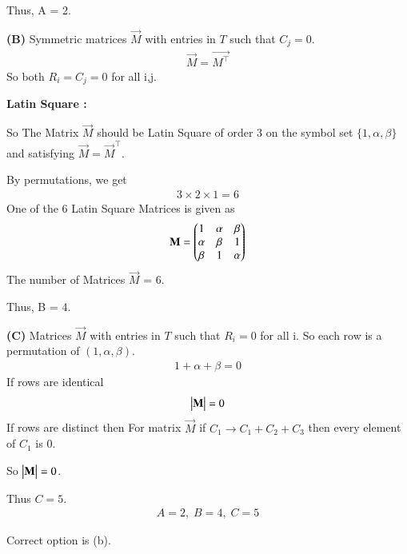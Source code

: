 \documentclass[journal]{IEEEtran}
\begin{document}
Thus, A = 2.

\textbf{(B)} Symmetric matrices $\vec{M}$ with entries in $T$ such that $C_j=0$.  
\begin{align}
\vec{M} = \vec{M^\top}
\end{align}
So both $R_i = C_j = 0$ for all i,j. 

\textbf{Latin Square :}

So The Matrix $\vec{M}$ should be Latin Square of order 3 on the symbol set $\{1,\alpha,\beta\}$ and satisfying $\vec{M}=\vec{M}^\top$.

By permutations, we get
\begin{align}
3\times2\times1 = 6
\end{align}
One of the 6 Latin Square Matrices is given as 
\begin{align}
\mathbf{M} = \begin{pmatrix}1 & \alpha & \beta \\
       \alpha & \beta & 1 \\
       \beta & 1 & \alpha\end{pmatrix}
\end{align}
The number of Matrices $\vec{M}$ = 6.

Thus, B = 4.

\textbf{(C)} Matrices $\vec{M}$ with entries in $T$ such that $R_i=0$ for all i. 
So each row is a permutation of $(1,\alpha,\beta)$.  
\begin{align}
1 + \alpha + \beta = 0
\end{align}
If rows are identical
\begin{align}
\begin{vmatrix}\mathbf{M}\end{vmatrix} = 0
\end{align}
If rows are distinct then
For matrix $\vec{M}$ if $C_1 \longrightarrow C_1 + C_2 + C_3$ then every element of $C_1$ is 0.  

So $\begin{vmatrix}\mathbf{M}\end{vmatrix} = 0$.

Thus $C=5$.
\begin{align}
\boxed{A=2, \; B=4, \; C=5}
\end{align}

Correct option is (b).
\end{document}
